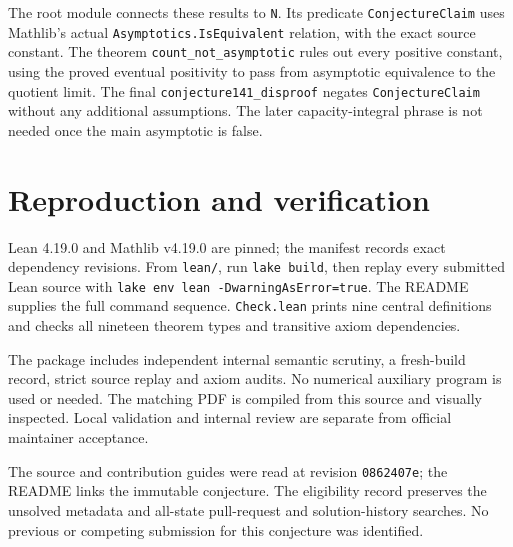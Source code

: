\documentclass[11pt]{article}
\begin{document}
The root module connects these results to \texttt{N}. Its predicate \texttt{ConjectureClaim} uses Mathlib's actual \texttt{Asymptotics.IsEquivalent} relation, with the exact source constant. The theorem \texttt{count\_not\_asymptotic} rules out every positive constant, using the proved eventual positivity to pass from asymptotic equivalence to the quotient limit. The final \texttt{conjecture141\_disproof} negates \texttt{ConjectureClaim} without any additional assumptions. The later capacity-integral phrase is not needed once the main asymptotic is false.

\section{Reproduction and verification}
Lean 4.19.0 and Mathlib v4.19.0 are pinned; the manifest records exact dependency revisions. From \texttt{lean/}, run \texttt{lake build}, then replay every submitted Lean source with \texttt{lake env lean -DwarningAsError=true}. The README supplies the full command sequence. \texttt{Check.lean} prints nine central definitions and checks all nineteen theorem types and transitive axiom dependencies.

The package includes independent internal semantic scrutiny, a fresh-build record, strict source replay and axiom audits. No numerical auxiliary program is used or needed. The matching PDF is compiled from this source and visually inspected. Local validation and internal review are separate from official maintainer acceptance.

The source and contribution guides were read at revision \texttt{0862407e}; the README links the immutable conjecture. The eligibility record preserves the unsolved metadata and all-state pull-request and solution-history searches. No previous or competing submission for this conjecture was identified.
\end{document}
